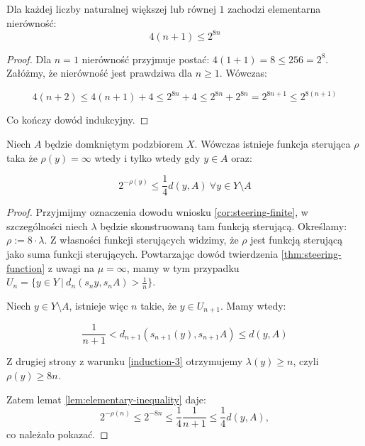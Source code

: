 \begin{lem} \label{lem:elementary-inequality}
  Dla każdej liczby naturalnej większej lub równej $1$ zachodzi elementarna nierówność:
  \[4(n+1) \leq 2^{8n}\]
  
  \begin{proof}
    Dla $n = 1$ nierówność przyjmuje postać: $4(1+1) = 8 \leq 256 = 2^8$.
    Załóżmy, że nierówność jest prawdziwa dla $n \geq 1$. Wówczas:
    
    \[4(n+2) \leq 4(n+1) + 4 \leq 2^{8n} + 4 \leq 2^{8n} + 2^{8n} = 2^{8n + 1} \leq 2^{8(n+1)}\]
    
    Co kończy dowód indukcyjny.
  \end{proof}
\end{lem}

\begin{cor} \label{cor:steering-dist}
  Niech $A$ będzie domkniętym podzbiorem $X$. Wówczas istnieje funkcja sterująca $\rho$ taka że $\rho(y) = \infty$ wtedy i tylko wtedy gdy $y \in A$ oraz:
  
  \[2^{-\rho(y)} \leq \frac{1}{4}d(y,A)\ \forall y \in Y \setminus A\]
  
  \begin{proof}
    Przyjmijmy oznaczenia dowodu wniosku \ref{cor:steering-finite}, w szczególności niech $\lambda$ będzie skonstruowaną tam funkcją sterującą. Określamy: $\rho := 8 \cdot \lambda$. Z własności funkcji sterujących widzimy, że $\rho$ jest funkcją sterującą jako suma funkcji sterujących.
    Powtarzając dowód twierdzenia \ref{thm:steering-function} z uwagi na $\mu = \infty$, mamy w tym przypadku $U_n = \{y \in Y\ |\ d_n(s_n y, s_n A) > \frac{1}{n}\}$.
    
    Niech $y \in Y \setminus A$, istnieje więc $n$ takie, że $y \in U_{n+1}$. Mamy wtedy:
    
    \[\frac{1}{n+1} < d_{n+1}(s_{n+1}(y), s_{n+1} A)  \leq d(y, A)\]
    
    Z drugiej strony z warunku \ref{induction-3} otrzymujemy $\lambda(y) \geq n$, czyli $\rho(y) \geq 8n$.
    
    Zatem lemat \ref{lem:elementary-inequality} daje:
    \[
      2^{-\rho(n)} \leq 2^{-8n} \leq \frac{1}{4}\frac{1}{n+1} \leq \frac{1}{4}d(y,A),
    \]
    co należało pokazać.
  \end{proof}
\end{cor}

